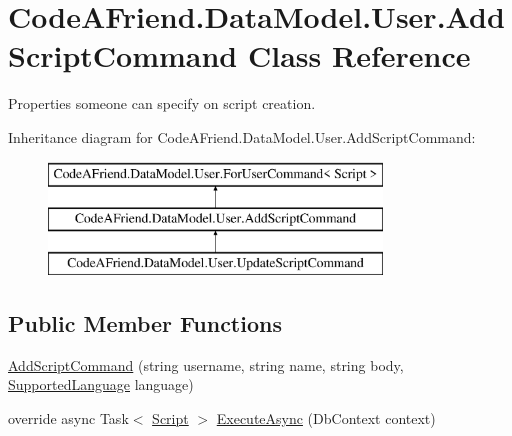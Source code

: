 \hypertarget{class_code_a_friend_1_1_data_model_1_1_user_1_1_add_script_command}{}\section{Code\+A\+Friend.\+Data\+Model.\+User.\+Add\+Script\+Command Class Reference}
\label{class_code_a_friend_1_1_data_model_1_1_user_1_1_add_script_command}


Properties someone can specify on script creation. 


Inheritance diagram for Code\+A\+Friend.\+Data\+Model.\+User.\+Add\+Script\+Command\+:\begin{figure}[H]
\begin{center}
\leavevmode
\includegraphics[height=3.000000cm]{class_code_a_friend_1_1_data_model_1_1_user_1_1_add_script_command}
\end{center}
\end{figure}
\subsection*{Public Member Functions}
\begin{DoxyCompactItemize}
\item 
\mbox{\hyperlink{class_code_a_friend_1_1_data_model_1_1_user_1_1_add_script_command_a658478472d9e31f35318e07433e85d1e}{Add\+Script\+Command}} (string username, string name, string body, \mbox{\hyperlink{namespace_code_a_friend_1_1_data_model_a13e088c525db1b03a4de75420ced79b2}{Supported\+Language}} language)
\item 
override async Task$<$ \mbox{\hyperlink{class_code_a_friend_1_1_data_model_1_1_script}{Script}} $>$ \mbox{\hyperlink{class_code_a_friend_1_1_data_model_1_1_user_1_1_add_script_command_a7105f586c7502c18a3ac2cfd567c90f0}{Execute\+Async}} (Db\+Context context)
\end{DoxyCompactItemize}
